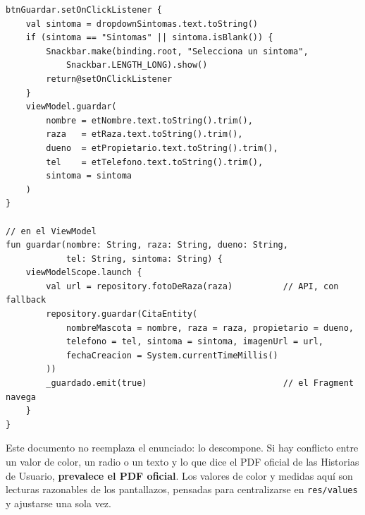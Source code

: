 \documentclass[11pt,letterpaper]{article}
\newcommand{\code}[1]{\texttt{\small #1}}
\begin{document}
\begin{verbatim}
btnGuardar.setOnClickListener {
    val sintoma = dropdownSintomas.text.toString()
    if (sintoma == "Sintomas" || sintoma.isBlank()) {
        Snackbar.make(binding.root, "Selecciona un sintoma",
            Snackbar.LENGTH_LONG).show()
        return@setOnClickListener
    }
    viewModel.guardar(
        nombre = etNombre.text.toString().trim(),
        raza   = etRaza.text.toString().trim(),
        dueno  = etPropietario.text.toString().trim(),
        tel    = etTelefono.text.toString().trim(),
        sintoma = sintoma
    )
}

// en el ViewModel
fun guardar(nombre: String, raza: String, dueno: String,
            tel: String, sintoma: String) {
    viewModelScope.launch {
        val url = repository.fotoDeRaza(raza)          // API, con fallback
        repository.guardar(CitaEntity(
            nombreMascota = nombre, raza = raza, propietario = dueno,
            telefono = tel, sintoma = sintoma, imagenUrl = url,
            fechaCreacion = System.currentTimeMillis()
        ))
        _guardado.emit(true)                           // el Fragment navega
    }
}
\end{verbatim}

\begin{notabox}
Este documento no reemplaza el enunciado: lo descompone. Si hay conflicto entre
un valor de color, un radio o un texto y lo que dice el PDF oficial de las
Historias de Usuario, \textbf{prevalece el PDF oficial}. Los valores de color y
medidas aqu\'i son lecturas razonables de los pantallazos, pensadas para
centralizarse en \code{res/values} y ajustarse una sola vez.
\end{notabox}
\end{document}
